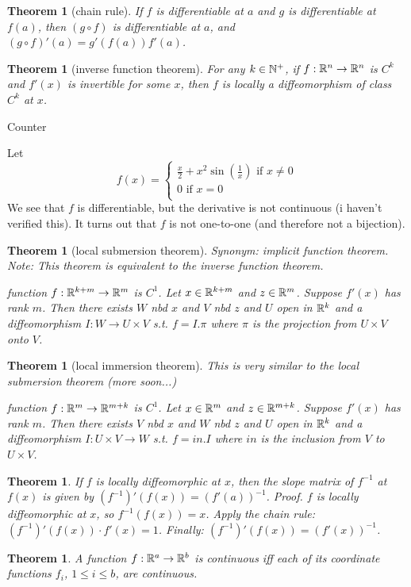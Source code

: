 \documentclass[11pt,leqno,oneside]{amsart}
\theoremstyle{mystyle} \newtheorem{thrm}[thm]{Theorem}
\theoremstyle{mystyle} \newtheorem{defi}[thm]{Definition}
\begin{document}
\begin{thrm}[chain rule]
	If $f$ is differentiable at $a$ and $g$ is differentiable at $f(a)$, then $(g \circ f)$ is differentiable at $a$, and $(g \circ f)'(a) = g'(f(a))f'(a)$.
\end{thrm}
\begin{thrm}[inverse function theorem]
	For any $k \in {\mathbb N}^+$, if $f:{\mathbb R}^n \to {\mathbb R}^n$ is $C^k$ and $f'(x)$ is invertible for some $x$, then $f$ is locally a diffeomorphism of class $C^k$ at $x$.
\end{thrm}
\begin{example}
	Counter\end{example}
\begin{example}
	Let $$f(x) =
	\begin{cases}
		\frac{x}{2} + x^2\sin\left(\frac 1x\right) \text{ if $x \neq 0$} \\
		0 \text{ if $x=0$} \\
	\end{cases}
	$$  We see that $f$ is differentiable, but the derivative is not continuous (i haven't verified this).  It turns out that $f$ is not one-to-one (and therefore not a bijection).
\end{example}
\begin{thrm}[local submersion theorem]
	Synonym: implicit function theorem.
	Note: This theorem is equivalent to the inverse function theorem.

	function $f : {\mathbb R}^{k+m} \to {\mathbb R}^m$ is $C^1$.
	Let $x \in {\mathbb R}^{k+m}$ and $z \in {\mathbb R}^m$.
	Suppose $f'(x)$ has rank $m$.
	Then there exists $W$ nbd $x$ and $V$ nbd $z$ and $U$ open in ${\mathbb R}^k$ and a diffeomorphism $I : W \to U \times V$
	s.t. $f = I.\pi$ where $\pi$ is the projection from $U \times V$ onto $V$.
\end{thrm}
\begin{thrm}[local immersion theorem]
	This is very similar to the local submersion theorem (more soon...)

	function $f : {\mathbb R}^{m} \to {\mathbb R}^{m+k}$ is $C^1$.
	Let $x \in {\mathbb R}^{m}$ and $z \in {\mathbb R}^{m+k}$.
	Suppose $f'(x)$ has rank $m$.
	Then there exists $V$ nbd $x$ and $W$ nbd $z$ and $U$ open in ${\mathbb R}^k$ and a diffeomorphism $I : U \times V \to W$
	s.t. $f = in.I$ where $in$ is the inclusion from $V$ to $U \times V$.
\end{thrm}
\begin{thrm}
	If $f$ is locally diffeomorphic at $x$, then the slope matrix of $f^{-1}$ at $f(x)$ is given by $(f^{-1})'(f(x)) = (f'(a))^{-1}$.
	Proof. $f$ is locally diffeomorphic at $x$, so $f^{-1}(f(x)) = x$.
	Apply the chain rule: $(f^{-1})'(f(x)) \cdot f'(x) = 1$.
	Finally: $(f^{-1})'(f(x)) = (f'(x))^{-1}$.
\end{thrm}
\begin{thrm}
	A function $f : {\mathbb R}^a \to {\mathbb R}^b$ is continuous iff each of its coordinate functions $f_i$, $1\leq i \leq b$, are continuous.
\end{thrm}
\end{document}
